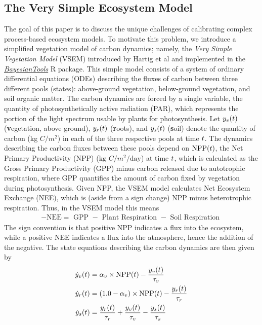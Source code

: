 \documentclass[12pt]{article}
\begin{document}
\subsection{The Very Simple Ecosystem Model}
The goal of this paper is to discuss the unique challenges of calibrating complex process-based ecosystem models. To motivate this problem, we introduce 
a simplified vegetation model of carbon dynamics; namely, the \textit{Very Simple Vegetation Model} (VSEM) introduced by Hartig et al \cite{Hartig} and implemented 
in the \href{https://github.com/florianhartig/BayesianTools}{\textit{BayesianTools}} R package. 
This simple model consists of a system of ordinary differential equations (ODEs) describing the fluxes of carbon between three different pools (states): 
above-ground vegetation, below-ground vegetation, and soil organic matter. The carbon dynamics are forced by a single variable, the quantity of photosynthetically 
active radiation (PAR), which represents the portion of the light spectrum usable by plants for photosynthesis. 
Let $y_v(t)$ (\textbf{v}egetation, above ground), $y_r(t)$ (\textbf{r}oots), and $y_s(t)$ (\textbf{s}oil) denote the quantity of carbon (kg $C/m^2$) in each of the three respective pools at time $t$. 
The dynamics describing the carbon fluxes between these pools depend on $\text{NPP}(t)$, the Net Primary Productivity (NPP) ($\text{kg } C/m^2/\text{day}$) at time $t$, 
which is calculated as the Gross Primary Productivity (GPP) minus carbon released due to autotrophic respiration, where GPP quantifies the amount of carbon 
fixed by vegetation during photosynthesis. Given NPP, the VSEM model calculates Net Ecosystem Exchange (NEE), which is (aside from a sign change) 
NPP minus heterotrophic 
respiration. Thus, in the VSEM model this means 
\begin{align}
-\text{NEE} = \text{ GPP } - \text{ Plant Respiration } - \text{ Soil Respiration } 
\end{align}
The sign convention is that positive NPP indicates a flux into the ecosystem, while a positive NEE indicates a flux into the atmosphere, hence the addition of the negative. 
The state equations describing the carbon dynamics are then given by
\begin{align}
\dot{y}_v(t) &= \alpha_v \times \text{NPP}(t) - \frac{y_v(t)}{\tau_v} \label{VSEM_ODE_system} \\
\dot{y}_r(t) &= (1.0 - \alpha_v) \times \text{NPP}(t) - \frac{y_r(t)}{\tau_r} \nonumber \\
\dot{y}_s(t) &= \frac{y_r(t)}{\tau_r} + \frac{y_v(t)}{\tau_v} - \frac{y_s(t)}{\tau_s} \nonumber 
\end{align}
\end{document}
